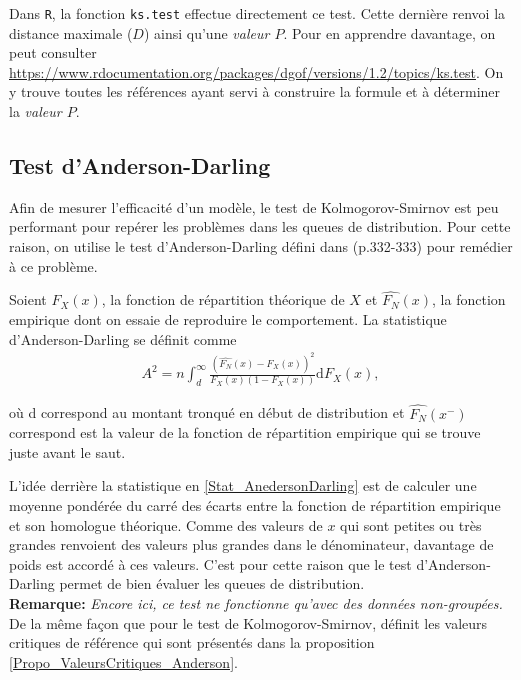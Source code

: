	Dans \texttt{R}, la fonction \texttt{ks.test} effectue directement ce test. Cette dernière renvoi la distance maximale ($D$) ainsi qu'une \textit{valeur $P$}. Pour en apprendre davantage, on peut consulter \url{https://www.rdocumentation.org/packages/dgof/versions/1.2/topics/ks.test}. On y trouve toutes les références ayant servi à construire la formule et à déterminer la \textit{valeur $P$}.
	
\subsection{Test d'Anderson-Darling}
	Afin de mesurer l'efficacité d'un modèle, le test de Kolmogorov-Smirnov est peu performant pour repérer les problèmes dans les queues de distribution. Pour cette raison, on utilise le test d'Anderson-Darling défini dans \cite{LossModels_Klugman2012}(p.332-333) pour remédier à ce problème.
	\begin{Definition}
		Soient $F_X(x)$, la fonction de répartition théorique de $X$ et $\widehat{F_N}(x)$, la fonction empirique dont on essaie de reproduire le comportement. La statistique d'Anderson-Darling se définit comme 
		\begin{align}\label{Stat_AnedersonDarling}
		A^2 = n \int_{d}^{\infty}\frac{\left( \widehat{F_N}(x)-F_X(x)\right)^2}{F_X(x) \left(1-F_X(x)\right)} \textrm{d}F_X(x),
		\end{align}

	 où d correspond au montant tronqué en début de distribution et $\widehat{F_N}(x^-)$ correspond est la valeur de la fonction de répartition empirique qui se trouve juste avant le saut.
	\end{Definition}

	L'idée derrière la statistique en \ref{Stat_AnedersonDarling} est de calculer une moyenne pondérée du carré des écarts entre la fonction de répartition empirique et son homologue théorique.
	Comme des valeurs de $x$ qui sont petites ou très grandes renvoient des valeurs plus grandes dans le dénominateur, davantage de poids est accordé à ces valeurs. C'est pour cette raison que le test d'Anderson-Darling permet de bien évaluer les queues de distribution.\\
	
	\textbf{Remarque:} \textit{Encore ici, ce test ne fonctionne qu'avec des données non-groupées.}\\
	
	De la même façon que pour le test de Kolmogorov-Smirnov, \cite{LossModels_Klugman2012} définit les valeurs critiques de référence qui sont présentés dans la proposition \ref{Propo_ValeursCritiques_Anderson}.
	
